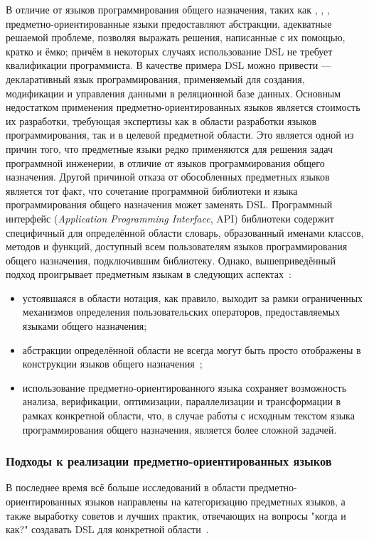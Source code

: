 В отличие от языков программирования общего назначения, таких как ,
, , предметно-ориентированные языки предоставляют
абстракции, адекватные решаемой проблеме, позволяя выражать решения,
написанные с их помощью, кратко и ёмко; причём в некоторых случаях
использование DSL не требует квалификации программиста.
В качестве примера DSL можно привести  ---  декларативный язык
программирования, применяемый для создания, модификации и управления данными в
реляционной базе данных.
Основным недостатком применения предметно-ориентированных языков является
стоимость их разработки, требующая экспертизы как в области разработки языков
программирования, так и в целевой предметной области.
Это является одной из причин того, что предметные языки редко применяются
для решения задач программной инженерии, в отличие от языков программирования
общего назначения.
Другой причиной отказа от обособленных предметных языков является тот факт,
что сочетание программной библиотеки и языка программирования общего
назначения может заменять DSL.
Программный интерфейс (\textit{Application Programming Interface},
API) библиотеки содержит специфичный для определённой
области словарь, образованный именами классов, методов и функций, доступный
всем пользователям языков программирования общего назначения, подключившим
библиотеку.
Однако, вышеприведённый подход проигрывает предметным языкам в следующих
аспектах~\cite{when-and-how-develop-dsl,dsl-spectrum-wile}:
\begin{itemize}
	\item устоявшаяся в области нотация, как правило, выходит за рамки
	ограниченных механизмов определения пользовательских операторов,
	предоставляемых языками общего назначения;
	\item абстракции определённой области не всегда могут быть
	просто отображены в конструкции языков общего назначения~\cite{dsl-traversal-transform};
	\item использование предметно-ориентированного языка сохраняет
	возможность анализа, верификации, оптимизации, параллелизации и
	трансформации в рамках конкретной области, что, в случае работы с
	исходным текстом языка программирования общего назначения, является
	более сложной задачей.
\end{itemize}

\subsubsection{Подходы к реализации предметно-ориентированных языков}
В последнее время всё больше исследований в области
предметно-ориен\-тированных языков направлены на категоризацию предметных
языков, а также выработку советов и лучших практик, отвечающих на вопросы
"когда и как?" создавать DSL для конкретной области~\cite{when-and-how-develop-dsl,study-on-preliminary-approaches-develop-dsl,spinellis-dsl-patterns}.
